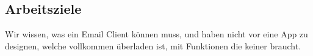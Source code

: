 \documentclass[a4paper,11pt]{article}
\begin{document}

\subsection{Arbeitsziele}

Wir wissen, was ein Email Client können muss, und haben nicht vor eine App zu designen, welche vollkommen überladen ist, mit Funktionen die keiner braucht.\\
\end{document}
